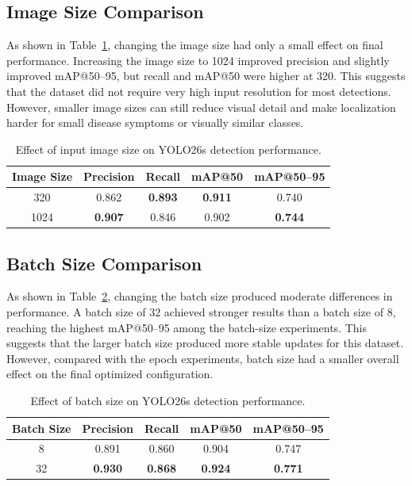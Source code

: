 \documentclass[10pt,twocolumn,letterpaper]{article}
\begin{document}
\subsection{Image Size Comparison}

As shown in Table~\ref{tab:imgsz_result}, changing the image size had only a small effect on final performance. Increasing the image size to 1024 improved precision and slightly improved mAP@50--95, but recall and mAP@50 were higher at 320. This suggests that the dataset did not require very high input resolution for most detections. However, smaller image sizes can still reduce visual detail and make localization harder for small disease symptoms or visually similar classes.

\begin{table}[!htbp]
  \centering
  \small
  \begin{tabular}{@{}ccccc@{}}
    \toprule
    Image Size & Precision & Recall & mAP@50 & mAP@50--95 \\
    \midrule
    320  & 0.862 & \textbf{0.893} & \textbf{0.911} & 0.740 \\
    1024 & \textbf{0.907} & 0.846 & 0.902 & \textbf{0.744} \\
    \bottomrule
  \end{tabular}
  \caption{Effect of input image size on YOLO26s detection performance.}
  \label{tab:imgsz_result}
\end{table}

\subsection{Batch Size Comparison}

As shown in Table~\ref{tab:batch_result}, changing the batch size produced moderate differences in performance. A batch size of 32 achieved stronger results than a batch size of 8, reaching the highest mAP@50--95 among the batch-size experiments. This suggests that the larger batch size produced more stable updates for this dataset. However, compared with the epoch experiments, batch size had a smaller overall effect on the final optimized configuration.

\begin{table}[!htbp]
  \centering
  \small
  \begin{tabular}{@{}ccccc@{}}
    \toprule
    Batch Size & Precision & Recall & mAP@50 & mAP@50--95 \\
    \midrule
    8  & 0.891 & 0.860 & 0.904 & 0.747 \\
    32 & \textbf{0.930} & \textbf{0.868} & \textbf{0.924} & \textbf{0.771} \\
    \bottomrule
  \end{tabular}
  \caption{Effect of batch size on YOLO26s detection performance.}
  \label{tab:batch_result}
\end{table}
\end{document}
